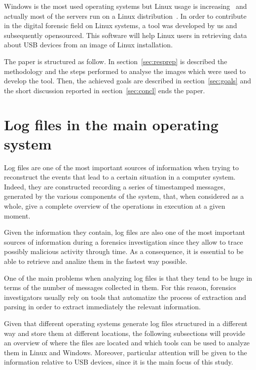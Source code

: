 \documentclass[a4paper]{article}
\begin{document}
Windows is the most used operating systems but Linux usage is
increasing~\cite{osShare} and actually most of the servers run on a Linux
distribution~\cite{InternetServer}. In order to contribute in the digital
forensic field on Linux systems, a tool was developed by us and subsequently
opensourced. This software will help Linux users in retrieving data about USB
devices from an image of Linux installation.

The paper is structured as follow. In section~\ref{sec:resprep} is described the
methodology and the steps performed to analyse the images which were used to
develop the tool. Then, the achieved goals are described in
section~\ref{sec:goals} and the short discussion reported in
section~\ref{sec:concl} ends the paper.

\section{Log files in the main operating system}
\label{sec:lit}
Log files are one of the most important sources of information when trying to
reconstruct the events that lead to a certain situation in a computer system.
Indeed, they are constructed recording a series of timestamped messages,
generated by the various components of the system, that, when considered as a
whole, give a complete overview of the operations in execution at a given
moment.

Given the information they contain, log files are also one of the most important
sources of information during a forensics investigation since they allow to
trace possibly malicious activity through time. As a consequence, it is
essential to be able to retrieve and analize them in the fastest way
possible.~\cite{finlayson1987log}

One of the main problems when analyzing log files is that they tend to be huge
in terms of the number of messages collected in them. For this reason, forensics
investigators usually rely on tools that automatize the process of extraction
and parsing in order to extract immediately the relevant information.

Given that different operating systems generate log files structured in a
different way and store them at different locations, the following subsections
will provide an overview of where the files are located and which tools can
be used to analyze them in Linux and Windows. Moreover, particular attention
will be given to the information relative to USB devices, since it is the main
focus of this study.
\end{document}
